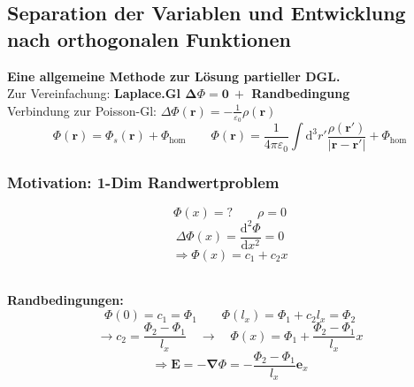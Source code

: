 \documentclass[titlepage,11pt,a4paper,ngerman]{report}
\newcommand{\tx}[1]{\textrm{#1}}
\newcommand{\dd}{\tx{d}}
\renewcommand{\Phi}{\varPhi}
\newcommand{\kq}{\frac{1}{4\pi\epsilon_0}}
\renewcommand{\vec}[1]{\boldsymbol{#1}}
\renewcommand{\epsilon}{\varepsilon}
\begin{document}
\subsection{Separation der Variablen und Entwicklung nach orthogonalen Funktionen}

\textbf{Eine allgemeine Methode zur Lösung partieller DGL.}\\[5pt]
Zur Vereinfachung: \textbf{Laplace.Gl $ \boldsymbol{ \Delta \Phi = 0 \ +} $ Randbedingung}\\[5pt]
Verbindung zur Poisson-Gl: $ \Delta \Phi(\vec{r}) = - \frac{1}{\epsilon_0} \rho(\vec{r}) $
\begin{equation*}
\Phi(\vec{r}) = \Phi_s(\vec{r}) + \Phi_{\tx{hom}} \qquad \Phi(\vec{r}) = \kq \int \dd^3 r' \frac{\rho(\vec{r}')}{|\vec{r} - \vec{r}'|} + \Phi_{\tx{hom}}
\end{equation*}

\subsubsection{Motivation: 1-Dim Randwertproblem}

\begin{minipage}{.5\linewidth}
	\centering
	\vspace{5pt}
\end{minipage}%
\begin{minipage}{.5\linewidth}
	$$ \Phi(x) = ? \qquad \rho = 0 $$
	\begin{equation*}
	\Delta \Phi(x) = \frac{\dd^2 \Phi}{\dd x^2} = 0
	\end{equation*}
	\begin{equation*}
	\Rightarrow \Phi(x) = c_1 + c_2 x
	\end{equation*}
\end{minipage}%
\\
\textbf{Randbedingungen:}\\
$$ \Phi(0) = c_1 = \Phi_1  \qquad \Phi(l_x) = \Phi_1 + c_2 l_x = \Phi_2 $$
\begin{equation*}
\rightarrow c_2 = \frac{\Phi_2 - \Phi_1}{l_x} \quad \rightarrow \quad \Phi(x) = \Phi_1 + \frac{\Phi_2 - \Phi_1}{l_x} x
\end{equation*}
\begin{equation*}
\Rightarrow \vec{E} = - \vec{\nabla} \Phi = - \frac{\Phi_2 - \Phi_1}{l_x} \vec{e}_x
\end{equation*}
\end{document}
